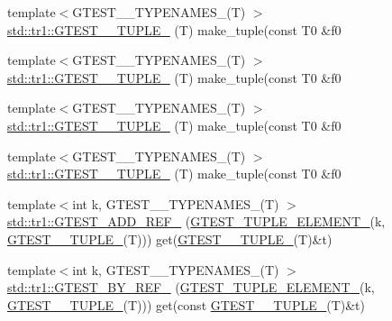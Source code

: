 \begin{DoxyCompactItemize}
{\footnotesize template$<$G\-T\-E\-S\-T\-\_\-\_\-\-T\-Y\-P\-E\-N\-A\-M\-E\-S\-\_\-(\-T) $>$ }\\\hyperlink{namespacestd_1_1tr1_a61277f5af24b20fce87a9fd94307ab34}{std\-::tr1\-::\-G\-T\-E\-S\-T\-\_\-\_\-\-T\-U\-P\-L\-E\-\_\-} (T) make\-\_\-tuple(const T0 \&f0
\item 
{\footnotesize template$<$G\-T\-E\-S\-T\-\_\-\_\-\-T\-Y\-P\-E\-N\-A\-M\-E\-S\-\_\-(\-T) $>$ }\\\hyperlink{namespacestd_1_1tr1_a29c8efcb79a4749e079b704c418266e6}{std\-::tr1\-::\-G\-T\-E\-S\-T\-\_\-\_\-\-T\-U\-P\-L\-E\-\_\-} (T) make\-\_\-tuple(const T0 \&f0
\item 
{\footnotesize template$<$G\-T\-E\-S\-T\-\_\-\_\-\-T\-Y\-P\-E\-N\-A\-M\-E\-S\-\_\-(\-T) $>$ }\\\hyperlink{namespacestd_1_1tr1_a6afad1f98814ccc897d0b02bc6fc4e7d}{std\-::tr1\-::\-G\-T\-E\-S\-T\-\_\-\_\-\-T\-U\-P\-L\-E\-\_\-} (T) make\-\_\-tuple(const T0 \&f0
\item 
{\footnotesize template$<$G\-T\-E\-S\-T\-\_\-\_\-\-T\-Y\-P\-E\-N\-A\-M\-E\-S\-\_\-(\-T) $>$ }\\\hyperlink{namespacestd_1_1tr1_aa636d3269bf1f368a7bc09ff158bc482}{std\-::tr1\-::\-G\-T\-E\-S\-T\-\_\-\_\-\-T\-U\-P\-L\-E\-\_\-} (T) make\-\_\-tuple(const T0 \&f0
\item 
{\footnotesize template$<$int k, G\-T\-E\-S\-T\-\_\-\_\-\-T\-Y\-P\-E\-N\-A\-M\-E\-S\-\_\-(\-T) $>$ }\\\hyperlink{namespacestd_1_1tr1_ad0769041710d18b917067576f84b0303}{std\-::tr1\-::\-G\-T\-E\-S\-T\-\_\-\-A\-D\-D\-\_\-\-R\-E\-F\-\_\-} (\hyperlink{gtest-tuple_8h_a1b7f133d8aa02e0b7afed7b66781eeb7}{G\-T\-E\-S\-T\-\_\-\-T\-U\-P\-L\-E\-\_\-\-E\-L\-E\-M\-E\-N\-T\-\_\-}(k, \hyperlink{gtest-tuple_8h_a275e7bcd84299cc44b9c1dba971951c4}{G\-T\-E\-S\-T\-\_\-\_\-\-T\-U\-P\-L\-E\-\_\-}(T))) get(\hyperlink{gtest-tuple_8h_a275e7bcd84299cc44b9c1dba971951c4}{G\-T\-E\-S\-T\-\_\-\_\-\-T\-U\-P\-L\-E\-\_\-}(T)\&t)
\item 
{\footnotesize template$<$int k, G\-T\-E\-S\-T\-\_\-\_\-\-T\-Y\-P\-E\-N\-A\-M\-E\-S\-\_\-(\-T) $>$ }\\\hyperlink{namespacestd_1_1tr1_a7c131d0c2462612a78012be16114f61d}{std\-::tr1\-::\-G\-T\-E\-S\-T\-\_\-\-B\-Y\-\_\-\-R\-E\-F\-\_\-} (\hyperlink{gtest-tuple_8h_a1b7f133d8aa02e0b7afed7b66781eeb7}{G\-T\-E\-S\-T\-\_\-\-T\-U\-P\-L\-E\-\_\-\-E\-L\-E\-M\-E\-N\-T\-\_\-}(k, \hyperlink{gtest-tuple_8h_a275e7bcd84299cc44b9c1dba971951c4}{G\-T\-E\-S\-T\-\_\-\_\-\-T\-U\-P\-L\-E\-\_\-}(T))) get(const \hyperlink{gtest-tuple_8h_a275e7bcd84299cc44b9c1dba971951c4}{G\-T\-E\-S\-T\-\_\-\_\-\-T\-U\-P\-L\-E\-\_\-}(T)\&t)

\end{DoxyCompactItemize}
